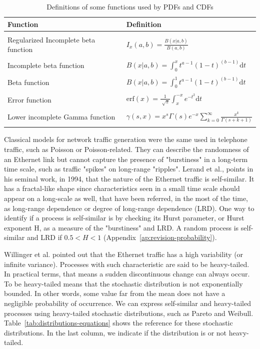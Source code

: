 \begin{table}[t!]
\centering
\caption{Definitions of some functions used by PDFs and CDFs}
\label{tab:distributions-definitions}
\begin{tabular}{ll}
\hline
Function                             & Definition \\ 
\hline
\\
Regularized Incomplete beta function & $ I_{x}(a, b) = \frac{B(x| a, b)}{B(a, b)} $           \\
\\
Incomplete beta function             & $ B(x| a, b) = \int_{0}^{x} t^{a - 1} (1 - t)^{(b - 1)} \text{d}t $           \\
\\
Beta function                        & $ B(x| a, b) = \int_{0}^{1} t^{a - 1} (1 - t)^{(b - 1)} \text{d}t $           \\
\\
Error function                       & $ \text{erf}(x) = \frac{1}{\sqrt[]{\pi}}\int_{x}^{-x} e^{-t^{2}} \text{d}t $           \\ 
\\
Lower incomplete Gamma function      & $ \gamma(s, x) = x^{s}\Gamma(s)e^{-x}\sum_{k = 0}^{\infty}\frac{x^{k}}{\Gamma(s+k+1)} $  \\
\\
\hline
\end{tabular}
\end{table}


Classical models for network traffic generation were the same used in telephone traffic, such as  Poisson or Poisson-related. They can describe the randomness of an Ethernet link but cannot capture the presence of "burstiness" in a long-term time scale, such as traffic "spikes" on long-range "ripples". Lerand et al.\cite{selfsimilar-ethernet}, points in his seminal work, in 1994, that the nature of the Ethernet traffic is self-similar. It has a fractal-like shape since characteristics seen in a small time scale should appear on a long-scale as well, that have been referred, in the most of the time, as long-range dependence or degree of long-range dependence (LRD). One way to identify if a process is self-similar is by checking its Hurst parameter, or Hurst exponent H, as a measure of the "burstiness" and LRD.  A random process is self-similar and LRD if $0.5 < H <1$\cite{stochastic-selfsimilar} (Appendix~\ref{ap:revision-probability}). 

Willinger et al. pointed out that the Ethernet traffic has a high variability (or infinite variance)\cite{selfsimilar-highvariability}.  Processes with such characteristic are said to be heavy-tailed. In practical terms, that means a sudden discontinuous change can always occur. To be heavy-tailed means that the stochastic distribution is not exponentially bounded. In other words, some value far from the mean does not have a negligible probability of occurrence. We can express self-similar and heavy-tailed processes using heavy-tailed stochastic distributions, such as Pareto and Weibull. Table~\ref{tab:distributions-equations} shows the reference for these stochastic distributions. In the last column, we indicate if the distribution is or not heavy-tailed. 

